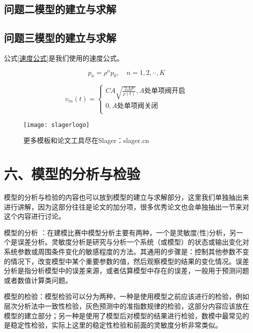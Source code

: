 \documentclass{article}
\begin{document}
\subsection{问题二模型的建立与求解}

\subsection{问题三模型的建立与求解}

公式\eqref{速度公式}是我们使用的速度公式。

\begin{equation}
p_{n}=\rho^{n}p_{0},\quad n=1,2,\cdot\cdot,K
\label{速度公式}
\end{equation}

\begin{equation}
v_{in}\left( t \right) =\begin{cases}
 CA\sqrt{\frac{2\varDelta P}{\rho \left( t \right)}},A\text{处单项阀开启}\\
 0,             A\text{处单项阀关闭}\\
\end{cases}
\end{equation}

\begin{figure}[h]
\centering
\texttt{[image: slagerlogo]}
\caption{更多模板和论文工具尽在Slager：slager.cn}
\end{figure}

\section{六、模型的分析与检验}

模型的分析与检验的内容也可以放到模型的建立与求解部分，这里我们单独抽出来进行讲解，因为这部分往往是论文的加分项，很多优秀论文也会单独抽出一节来对这个内容进行讨论。

模型的分析 ：在建模比赛中模型分析主要有两种，一个是灵敏度(性)分析，另一个是误差分析。灵敏度分析是研究与分析一个系统（或模型）的状态或输出变化对系统参数或周围条件变化的敏感程度的方法。其通用的步骤是：控制其他参数不变的情况下，改变模型中某个重要参数的值，然后观察模型的结果的变化情况。误差分析是指分析模型中的误差来源，或者估算模型中存在的误差，一般用于预测问题或者数值计算类问题。

模型的检验：模型检验可以分为两种，一种是使用模型之前应该进行的检验，例如层次分析法中一致性检验，灰色预测中的准指数规律的检验，这部分内容应该放在模型的建立部分；另一种是使用了模型后对模型的结果进行检验，数模中最常见的是稳定性检验，实际上这里的稳定性检验和前面的灵敏度分析非常类似。
\end{document}
